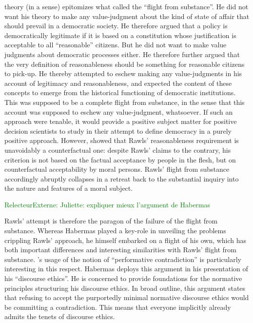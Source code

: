 \documentclass[preprint,11pt]{elsarticle}
\newcommand{\commentE}[1]{\textcolor{green}{RelecteurExterne: #1}}
\begin{document}
\cite{rawls_political_2005} theory (in a sense) epitomizes what \cite{estlund_democratic_2009} called the “flight from substance”. He did not want his theory to make any value-judgment about the kind of state of affair that should prevail in a democratic society. He therefore argued that a policy is democratically legitimate if it is based on a constitution whose justification is acceptable to all “reasonable” citizens. But he did not want to make value judgments about democratic processes either. He therefore further argued that the very definition of reasonableness should be something for reasonable citizens to pick-up. He thereby attempted to eschew making any value-judgments in his account of legitimacy and reasonableness, and expected the content of these concepts to emerge from the historical functioning of democratic institutions. This was supposed to be a complete flight from substance, in the sense that this account was supposed to eschew any value-judgment, whatsoever. If such an approach were tenable, it would provide a positive subject matter for positive decision scientists to study in their attempt to define democracy in a purely positive approach. However, \cite{habermas_reconciliation_1995} showed that Rawls’ reasonableness requirement is unavoidably a counterfactual one: despite Rawls’ claims to the contrary, his criterion is not based on the factual acceptance by people in the flesh, but on counterfactual acceptability by moral persons. Rawls’ flight from substance accordingly abruptly collapses in a retreat back to the substantial inquiry into the nature and features of a moral subject.

\commentE{Juliette: expliquer mieux l'argument de Habermas}

Rawls’ attempt is therefore the paragon of the failure of the flight from substance. Whereas Habermas played a key-role in unveiling the problems crippling Rawls’ approach, he himself embarked on a flight of his own, which has both important differences and interesting similarities with Rawls’ flight from substance. \cite{habermas_moralbewustsein_1983}'s usage of the notion of “performative contradiction” is particularly interesting in this respect. Habermas deploys this argument in his presentation of his “discourse ethics”. He is concerned to provide foundations for the normative principles structuring his discourse ethics. In broad outline, this argument states that refusing to accept the purportedly minimal normative discourse ethics would be committing a contradiction. This means that everyone implicitly already admits the tenets of discourse ethics. 
\end{document}
